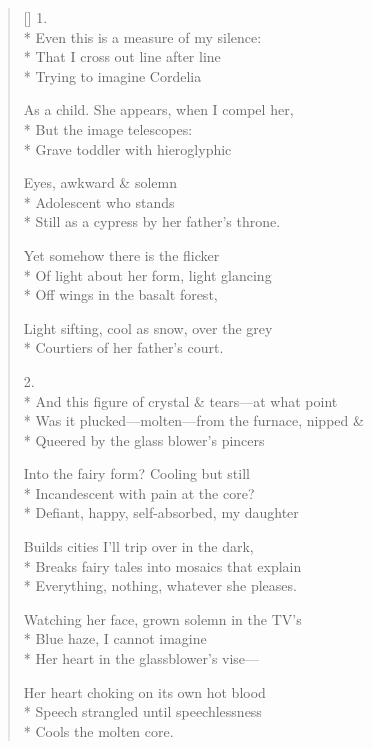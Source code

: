 \label{ch:cordelias_daughter}
\settowidth{\versewidth}{Was it plucked---molten---from the furnace, nipped \&}
\begin{verse}[\versewidth]
1.\\*
Even this is a measure of my silence:\\*
That I cross out line after line\\*
Trying to imagine Cordelia

As a child.  She appears, when I compel her,\\*
But the image telescopes:\\*
Grave toddler with hieroglyphic 

Eyes, awkward \& solemn\\*
Adolescent who stands\\*
Still as a cypress by her father's throne.

Yet somehow there is the flicker\\*
Of light about her form, light glancing\\*
Off wings in the basalt forest,

Light sifting, cool as snow, over the grey\\*
Courtiers of her father's court.

2.\\*
And this figure of crystal \& tears---at what point\\*
Was it plucked---molten---from the furnace, nipped \&\\*
Queered by the glass blower's pincers

Into the fairy form? Cooling but still\\*
Incandescent with pain at the core?\\*
Defiant, happy, self-absorbed, my daughter

Builds cities I'll trip over in the dark,\\*
Breaks fairy tales into mosaics that explain\\*
Everything, nothing, whatever she pleases.

Watching her face, grown solemn in the TV's\\*
Blue haze, I cannot imagine\\*
Her heart in the glassblower's vise---

Her heart choking on its own hot blood\\*
Speech strangled until speechlessness\\*
Cools the molten core.
\end{verse}
